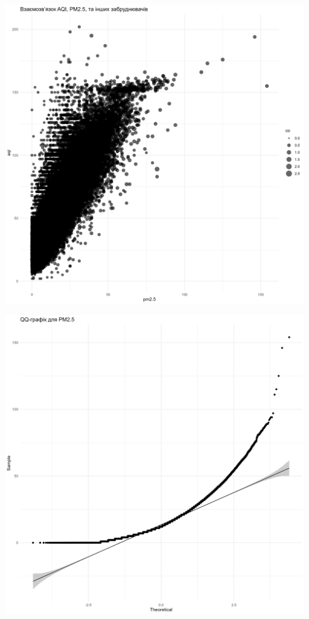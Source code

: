 \documentclass[./report.tex]{subfiles}
\begin{document}
\begin{enumerate}
    \includegraphics[width=6in]{plots/question1/aqi_pm_polutants.png}

    \includegraphics[width=6in]{plots/question1/qq_pm2_5.png}


\end{enumerate}
\end{document}
